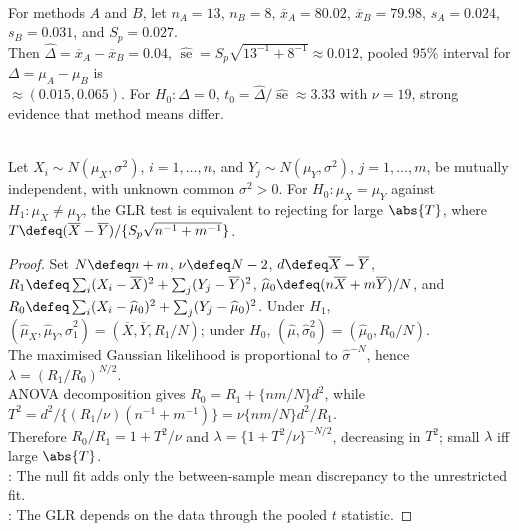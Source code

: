\begin{example} \label{ex:latent-heat-two-methods} \\
For methods $A$ and $B$, let $n_A=13$, $n_B=8$, $\overline{x}_A=80.02$, $\overline{x}_B=79.98$, $s_A=0.024$, $s_B=0.031$, and $S_p=0.027$.\\
Then $\widehat{\Delta}=\overline{x}_A-\overline{x}_B=0.04$, $\widehat{\operatorname{se}}=S_p\sqrt{13^{-1}+8^{-1}}\approx0.012$, pooled $95\%$ interval for $\Delta=\mu_A-\mu_B$ is\\
$\approx (0.015,0.065)$. For $H_0:\Delta=0$, $t_0=\widehat{\Delta}/\widehat{\operatorname{se}}\approx3.33$ with $\nu=19$, strong evidence that method means differ.
\end{example}

\begin{proposition} \label{prop:two-sample-normal-glrt-equivalent-to-t} \\
Let $X_i\sim N(\mu_X,\sigma^2)$, $i=1,\ldots,n$, and $Y_j\sim N(\mu_Y,\sigma^2)$, $j=1,\ldots,m$, be mutually independent, with unknown common $\sigma^2>0$. For $H_0:\mu_X=\mu_Y$ against $H_1:\mu_X\neq\mu_Y$, the GLR test is equivalent to rejecting for large $\abs{T}$, where $T\defeq(\overline{X}-\overline{Y})/\{S_p\sqrt{n^{-1}+m^{-1}}\}$.
\begin{proof} Set $N\defeq n+m$, $\nu\defeq N-2$, $d\defeq\overline{X}-\overline{Y}$, $R_1\defeq\sum_i(X_i-\overline{X})^2+\sum_j(Y_j-\overline{Y})^2$, $\widehat{\mu}_0\defeq(n\overline{X}+m\overline{Y})/N$, and $R_0\defeq\sum_i(X_i-\widehat{\mu}_0)^2+\sum_j(Y_j-\widehat{\mu}_0)^2$. Under $H_1$, $(\widehat{\mu}_X,\widehat{\mu}_Y,\widehat{\sigma}_1^2)=(\overline{X},\overline{Y},R_1/N)$; under $H_0$, $(\widehat{\mu},\widehat{\sigma}_0^2)=(\widehat{\mu}_0,R_0/N)$.\\
The maximised Gaussian likelihood is proportional to $\widehat{\sigma}^{-N}$, hence $\lambda=(R_1/R_0)^{N/2}$.\\
ANOVA decomposition gives $R_0=R_1+\{nm/N\}d^2$, while $T^2=d^2/\{(R_1/\nu)(n^{-1}+m^{-1})\}=\nu\{nm/N\}d^2/R_1$.\\
Therefore $R_0/R_1=1+T^2/\nu$ and $\lambda=\{1+T^2/\nu\}^{-N/2}$, decreasing in $T^2$; small $\lambda$ iff large $\abs{T}$.\\
: The null fit adds only the between-sample mean discrepancy to the unrestricted fit.\\
: The GLR depends on the data through the pooled $t$ statistic.
\end{proof}
\end{proposition}

